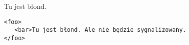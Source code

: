\documentclass{article}
\begin{document}
Tu jest błond.

\lstset{language=XML}
\begin{lstlisting}
<foo>
   <bar>Tu jest błond. Ale nie będzie sygnalizowany.
</foo>

\end{lstlisting}
\end{document}
